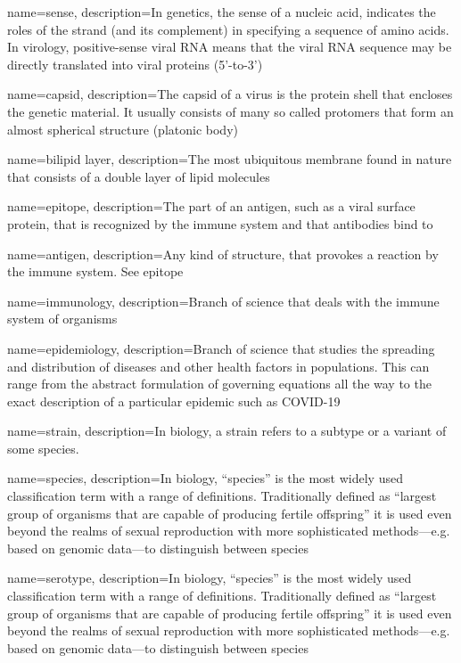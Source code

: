 {
    name=sense,
    description={In genetics, the sense of a nucleic acid, indicates the roles of the strand (and its complement) in specifying a sequence of amino acids. In virology, positive-sense viral RNA means that the viral RNA sequence may be directly translated into viral proteins (5'-to-3')}
}

{
    name=capsid,
    description={The capsid of a virus is the protein shell that encloses the genetic material. It usually consists of many so called protomers that form an almost spherical structure (platonic body)}
}

{
    name=bilipid layer,
    description={The most ubiquitous membrane found in nature that consists of a double layer of lipid molecules}
}

{
    name=epitope,
    description={The part of an \gls{antigen}, such as a viral surface protein, that is recognized by the immune system and that antibodies bind to}
}

{
    name=antigen,
    description={Any kind of structure, that provokes a reaction by the immune system. See \gls{epitope}}
}

{
    name=immunology,
    description={Branch of science that deals with the immune system of organisms}
}

{
    name=epidemiology,
    description={Branch of science that studies the spreading and distribution of diseases and other health factors in populations. This can range from the abstract formulation of governing equations all the way to the exact description of a particular epidemic such as COVID-19}
}

{
    name=strain,
    description={In biology, a strain refers to a subtype or a variant of some species.}
}

{
    name=species,
    description={In biology, ``species'' is the most widely used classification term with a range of definitions. Traditionally defined as ``largest group of organisms that are capable of producing fertile offspring'' it is used even beyond the realms of sexual reproduction with more sophisticated methods---e.g. based on genomic data---to distinguish between species}
}

{
    name=serotype,
    description={In biology, ``species'' is the most widely used classification term with a range of definitions. Traditionally defined as ``largest group of organisms that are capable of producing fertile offspring'' it is used even beyond the realms of sexual reproduction with more sophisticated methods---e.g. based on genomic data---to distinguish between species}
}

